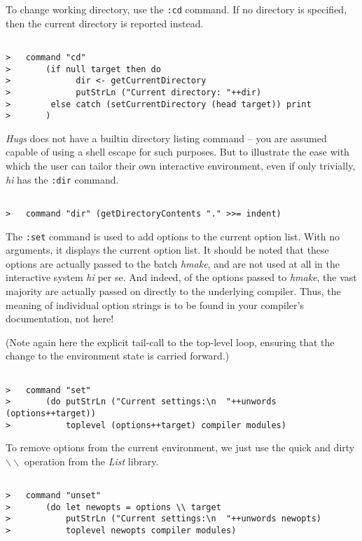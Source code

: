 \documentclass[a4paper]{article}
\begin{document}
To change working directory, use the {\tt :cd} command.  If no
directory is specified, then the current directory is reported instead.

\begin{verbatim}

>   command "cd"
>       (if null target then do
>             dir <- getCurrentDirectory
>             putStrLn ("Current directory: "++dir)
>        else catch (setCurrentDirectory (head target)) print
>       )

\end{verbatim}

{\em Hugs} does not have a builtin directory listing command --
you are assumed capable of using a shell escape for such purposes.
But to illustrate the ease with which the user can tailor their
own interactive environment, even if only trivially, {\em hi} has
the {\tt :dir} command.

\begin{verbatim}

>   command "dir" (getDirectoryContents "." >>= indent)

\end{verbatim}

The {\tt :set} command is used to add options to the current option list.
With no arguments, it displays the current option list.  It should be
noted that these options are actually passed to the batch {\em hmake},
and are not used at all in the interactive system {\em hi} per se.
And indeed, of the options passed to {\em hmake}, the vast majority
are actually passed on directly to the underlying compiler.  Thus,
the meaning of individual option strings is to be found in
your compiler's documentation, not here!

(Note again here the explicit tail-call to the top-level loop,
ensuring that the change to the environment state is carried forward.)

\begin{verbatim}

>   command "set"
>       (do putStrLn ("Current settings:\n  "++unwords (options++target))
>           toplevel (options++target) compiler modules)

\end{verbatim}

To remove options from the current environment, we just use the quick
and dirty $\backslash\backslash$ operation from the {\em List} library.

\begin{verbatim}

>   command "unset"
>       (do let newopts = options \\ target
>           putStrLn ("Current settings:\n  "++unwords newopts)
>           toplevel newopts compiler modules)

\end{verbatim}
\end{document}

